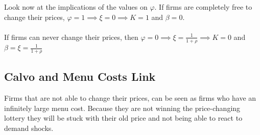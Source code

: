 Look now at the implications of the values on $\varphi$. If firms are completely free to change their prices, $\varphi=1 \implies \xi=0 \implies K=1$ and $\beta=0$. 
\paragraph{}
If firms can never change their prices, then $\varphi=0 \implies \xi=\frac{1}{1+\rho} \implies K=0$ and $\beta=\xi=\frac{1}{1+\rho}$



\begin{tcolorbox}
\subsection*{Calvo and Menu Costs Link}
\tcblower
Firms that are not able to change their prices, can be seen as firms who have an infinitely large menu cost. Because they are not winning the price-changing lottery they will be stuck with their old price and not being able to react to demand shocks. 
\end{tcolorbox}